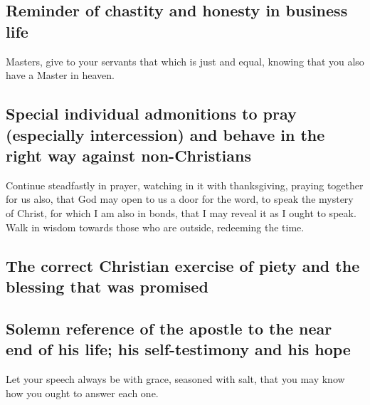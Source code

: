 \hypertarget{reminder-of-chastity-and-honesty-in-business-life}{%
\subsection{Reminder of chastity and honesty in business
life}\label{reminder-of-chastity-and-honesty-in-business-life}}

 Masters, give to your servants that which is just and
equal, knowing that you also have a Master in heaven.

\hypertarget{special-individual-admonitions-to-pray-especially-intercession-and-behave-in-the-right-way-against-non-christians}{%
\subsection{Special individual admonitions to pray (especially
intercession) and behave in the right way against
non-Christians}\label{special-individual-admonitions-to-pray-especially-intercession-and-behave-in-the-right-way-against-non-christians}}

 Continue steadfastly in prayer, watching in it with
thanksgiving,  praying together for us also, that God may
open to us a door for the word, to speak the mystery of Christ, for
which I am also in bonds,  that I may reveal it as I ought
to speak.  Walk in wisdom towards those who are outside,
redeeming the time.

\hypertarget{the-correct-christian-exercise-of-piety-and-the-blessing-that-was-promised}{%
\subsection{The correct Christian exercise of piety and the blessing
that was
promised}\label{the-correct-christian-exercise-of-piety-and-the-blessing-that-was-promised}}

\hypertarget{solemn-reference-of-the-apostle-to-the-near-end-of-his-life-his-self-testimony-and-his-hope}{%
\subsection{Solemn reference of the apostle to the near end of his life;
his self-testimony and his
hope}\label{solemn-reference-of-the-apostle-to-the-near-end-of-his-life-his-self-testimony-and-his-hope}}

 Let your speech always be with grace, seasoned with salt,
that you may know how you ought to answer each one.

